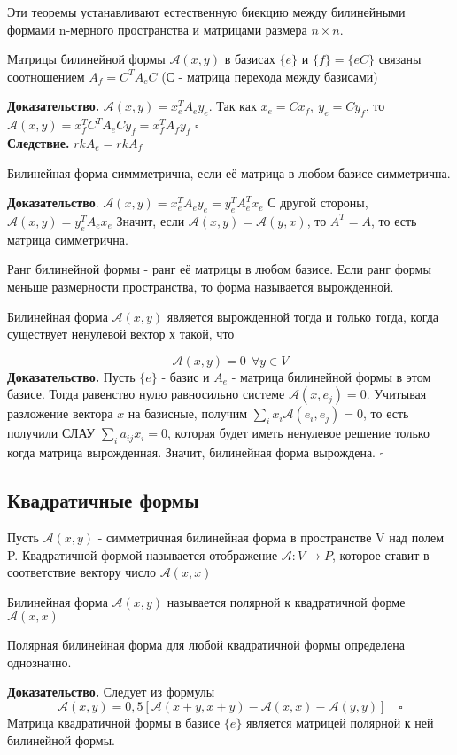 Эти теоремы устанавливают естественную биекцию между билинейными формами 
n-мерного пространства и матрицами размера $n\times n$. 
\begin{theor}
Матрицы билинейной формы $\mathcal A(x,y)$ в базисах $\{e\}$ и $\{f\}=\{eC\}$ 
связаны соотношением $A_f=C^TA_eC$ (С - матрица перехода между базисами)
\end{theor}
\textbf{Доказательство.} $\mathcal A(x,y)=x_e^TA_ey_e$. Так как
$x_e=Cx_f,~y_e=Cy_f$, то $\mathcal A(x,y)=x_f^TC^TA_eCy_f=x_f^TA_fy_f$
$\square$\\
\textbf{Следствие.} $rkA_e=rkA_f$
\begin{theor}
Билинейная форма симмметрична, если её матрица в любом базисе симметрична. 
\end{theor}
\textbf{Доказательство}. $\mathcal A(x,y)=x_e^TA_ey_e=y_e^TA^T_ex_e$
С другой стороны, $\mathcal A(x,y)=y_e^TA_ex_e$
Значит, если $\mathcal A(x,y)=\mathcal A(y,x)$, то $A^T=A$, то есть матрица 
симметрична. 
\begin{defin}
Ранг билинейной формы - ранг её матрицы в любом базисе. Если ранг формы меньше
размерности пространства, то форма называется вырожденной. 
\end{defin}
\begin{theor}
Билинейная форма $\mathcal A(x,y)$ является вырожденной тогда и только тогда,
когда существует ненулевой вектор х такой, что
\end{theor}
$$\mathcal A(x,y)=0~~\forall y\in V$$
\textbf{Доказательство.} Пусть $\{e\}$ - базис и $A_e$ - матрица билинейной 
формы в этом базисе. Тогда равенство нулю равносильно системе 
$\mathcal A(x,e_j)=0$. Учитывая
разложение вектора $x$ на базисные, получим $\sum_ix_i\mathcal A(e_i,e_j)=0$,
то есть  получили СЛАУ $\sum_ia_{ij}x_i=0$, которая будет иметь ненулевое
решение только когда матрица вырожденная. Значит, билинейная форма вырождена.
$\square$
\subsection{Квадратичные формы}
\begin{defin}
Пусть $\mathcal A(x,y)$ - симметричная билинейная форма в пространстве V над
полем P. Квадратичной формой называется отображение $\mathcal A\colon V\to P$,
которое ставит в соответствие вектору число $\mathcal A(x,x)$
\end{defin}
Билинейная форма $\mathcal A(x,y)$ называется полярной к квадратичной форме 
$\mathcal A(x,x)$
\begin{theor}
Полярная билинейная форма для любой квадратичной формы определена однозначно.
\end{theor}
\textbf{Доказательство.} Следует из формулы
$$\mathcal A(x,y)=0,5[\mathcal A(x+y,x+y)-\mathcal A(x,x)-\mathcal A(y,y)]
\quad\square$$
Матрица квадратичной формы в базисе $\{e\}$ является матрицей полярной к ней
билинейной формы.

